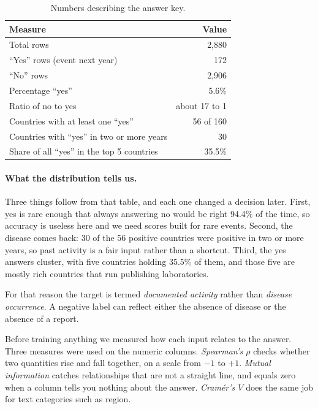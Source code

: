\documentclass[10pt]{article}
\begin{document}
\begin{table}[htbp]
\centering
\caption{Numbers describing the answer key.}
\small
\begin{tabular}{@{}lr@{}}
\toprule
\textbf{Measure} & \textbf{Value} \\
\midrule
Total rows & 2,880 \\
``Yes'' rows (event next year) & 172 \\
``No'' rows & 2,906 \\
Percentage ``yes'' & 5.6\% \\
Ratio of no to yes & about 17 to 1 \\
Countries with at least one ``yes'' & 56 of 160 \\
Countries with ``yes'' in two or more years & 30 \\
Share of all ``yes'' in the top 5 countries & 35.5\% \\
\bottomrule
\end{tabular}
\end{table}

\paragraph{What the distribution tells us.} Three things follow from that table, and each
one changed a decision later. First, yes is rare enough that always answering no would be
right 94.4\% of the time, so accuracy is useless here and we need scores built for rare
events. Second, the disease comes back: 30 of the 56 positive countries were positive in
two or more years, so past activity is a fair input rather than a shortcut. Third, the yes
answers cluster, with five countries holding 35.5\% of them, and those five are mostly rich
countries that run publishing laboratories.

For that reason the target is termed \emph{documented activity} rather than
\emph{disease occurrence}. A negative label can reflect either the absence of disease or the
absence of a report.

Before training anything we measured how each input relates to the answer. Three measures
were used on the numeric columns.
\emph{Spearman's $\rho$} checks whether two quantities rise and fall together, on a scale
from $-1$ to $+1$. \emph{Mutual information} catches relationships that are not a straight
line, and equals zero when a column tells you nothing about the answer. \emph{Cram\'er's
$V$} does the same job for text categories such as region.
\end{document}
